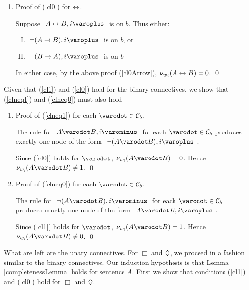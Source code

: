 \begin{proof*}
\begin{enumerate}
	\item Proof of (\ref{cl0}) for $ \leftrightarrow $.
	
			Suppose $ \like{ \dNodei{ A \biarrow B } } $ is on $ b $.
			Thus either:
			\begin{enumerate}[(I)]
				\item $ \like{ \dNode{ \neg ( A \arrow B ) }{ i } } $ is on $ b $, or
				\item $ \like{ \dNode{ \neg ( B \arrow A ) }{ i } } $ is on $ b $
			\end{enumerate}
			In either case, by the above proof (\ref{cl0Arrow}), $ \mathcal{\nu}_{ w_i }({ A \leftrightarrow B }) = 0 $.
			\qed
	
	\setcounter{enumi_saved}{\value{enumi}}
\end{enumerate}
Given that (\ref{cl1}) and (\ref{cl0}) hold for the binary connectives, we show that (\ref{clneq1}) and (\ref{clneq0}) must also hold

\begin{enumerate}
	\setcounter{enumi}{\value{enumi_saved}}
	
	\item Proof of (\ref{clneq1}) for each $ \varodot \in \BinaryConnectives $.

		The rule for $ \like{ \uNodei{ A \varodot B }} $ for each $ \varodot \in \BinaryConnectives $ produces exactly one node of the form $ \like{ \dNodei{ \neg (A \varodot B)}} $.
		
		Since (\ref{cl0}) holds for $ \varodot $, $ \Valwi{ A \varodot B } = 0 $.
		Hence $ \Valwi{ A \varodot B } \neq 1 $.
		\qed

	\item Proof of (\ref{clneq0}) for each $ \varodot \in \BinaryConnectives $.
		
		The rule for $ \like{ \uNodei{ \neg (A \varodot B) }} $ for each $ \varodot \in \BinaryConnectives $ produces exactly one node of the form $ \like{ \dNodei{ A \varodot B }} $.
		
		Since (\ref{cl1}) holds for $ \varodot $, $ \Valwi{ A \varodot B } = 1 $.
		Hence $ \Valwi{ A \varodot B } \neq 0 $.
		\qed
	
	\setcounter{enumi_saved}{\value{enumi}}
\end{enumerate}
What are left are the unary connectives. For $ \Box $ and $ \Diamond $, we proceed in a fashion similar to the binary connectives. Our induction hypothesis is that Lemma \ref{completenessLemma} holds for sentence $A$. First we show that conditions (\ref{cl1}) and (\ref{cl0}) hold for $ \Box $ and $ \Diamond $.


\end{proof*}
